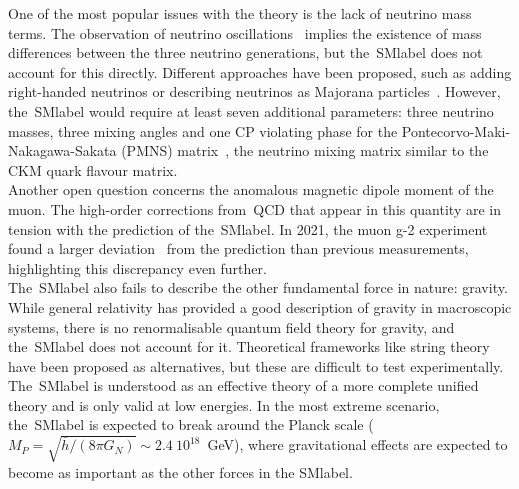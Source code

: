 One of the most popular issues with the theory is the lack of neutrino mass terms. The observation of neutrino oscillations~\cite{neutrinoosc}  implies the existence of mass differences between the three neutrino generations, but the~\acrshort{SMlabel} does not account for this directly. Different approaches have been proposed, such as adding right-handed neutrinos or describing neutrinos as Majorana particles~\cite{Majorana2006}. However, the~\acrshort{SMlabel} would require at least seven additional parameters: three neutrino masses, three mixing angles and one CP violating phase for the Pontecorvo-Maki-Nakagawa-Sakata (PMNS) matrix~\cite{10.1143/PTP.28.870,Pontecorvo:1967fh}, the neutrino mixing matrix similar to the CKM quark flavour matrix.\\

Another open question concerns the anomalous magnetic dipole moment of the muon. The high-order corrections from~\acrshort{QCD} that appear in this quantity are in tension with the prediction of the~\acrshort{SMlabel}. In 2021, the muon g-2 experiment found a larger deviation~\cite{PhysRevLett.126.141801} from the prediction than previous measurements, highlighting this discrepancy even further.\\


The~\acrshort{SMlabel} also fails to describe the other fundamental force in nature: gravity. While general relativity has provided a good description of gravity in macroscopic systems, there is no renormalisable quantum field theory for gravity, and the~\acrshort{SMlabel} does not account for it. Theoretical frameworks like string theory have been proposed as alternatives, but these are difficult to test experimentally. The~\acrshort{SMlabel} is understood as an effective theory of a more complete unified theory and is only valid at low energies. In the most extreme scenario, the~\acrshort{SMlabel} is expected to break around the Planck scale ($M_P=\sqrt{\bar{h}/(8\pi G_N)}\sim 2.4\ 10^{18}$~GeV), where gravitational effects are expected to become as important as the other forces in the \acrshort{SMlabel}.\\

